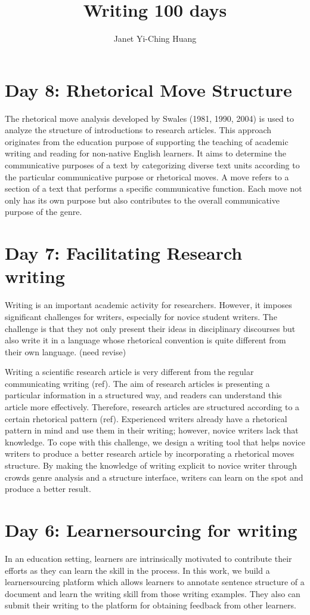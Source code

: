 \documentclass[a4paper]{article}
\title{\textbf{Writing 100 days}}
\author{Janet Yi-Ching Huang}
\begin{document}
\maketitle
\section{Day 8: Rhetorical Move Structure}
The rhetorical move analysis developed by Swales (1981, 1990, 2004) is used to analyze the structure of introductions to research articles. This approach originates from the education purpose of supporting the teaching of academic writing and reading for non-native English learners. It aims to determine the communicative purposes of a text by categorizing diverse text units according to the particular communicative purpose or rhetorical moves. A move refers to a section of a text that performs a specific communicative function. Each move not only has its own purpose but also contributes to the overall communicative purpose of the genre.

\section{Day 7: Facilitating Research writing}
Writing is an important academic activity for researchers. However, it imposes significant challenges for writers, especially for novice student writers. The challenge is that they not only present their ideas in disciplinary discourses but also write it in a language whose rhetorical convention is quite different from their own language. (need revise)

Writing a scientific research article is very different from the regular communicating writing (ref). The aim of research articles is presenting a particular information in a structured way, and readers can understand this article more effectively. Therefore, research articles are structured according to a certain rhetorical pattern (ref). Experienced writers already have a rhetorical pattern in mind and use them in their writing; however, novice writers lack that knowledge. To cope with this challenge, we design a writing tool that helps novice writers to produce a better research article by incorporating a rhetorical moves structure. By making the knowledge of writing explicit to novice writer through crowds genre analysis and a structure interface, writers can learn on the spot and produce a better result. 

\section{Day 6: Learnersourcing for writing}
In an education setting, learners are intrinsically motivated to contribute their efforts as they can learn the skill in the process. In this work, we build a learnersourcing platform which allows learners to annotate sentence structure of a document and learn the writing skill from those writing examples. They also can submit their writing to the platform for obtaining feedback from other learners. 
\end{document}
